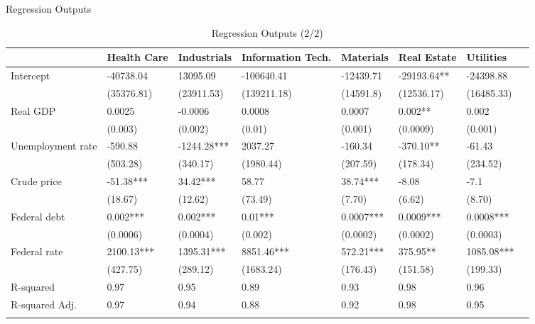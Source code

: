 \documentclass[11pt]{beamer}
\begin{document}
\begin{frame}{Regression Outputs}

\begin{table}
\caption{Regression Outputs (2/2)}
\label{}
\begin{center}
\tiny
\begin{tabular}{llllllll}  \hline                    &  Health Care & Industrials & Information Tech. & Materials & Real Estate & Utilities  \\  \hline 
Intercept             & -40738.04      & 13095.09        & -100640.41          & -12439.71     & -29193.64**    & -24398.88      \\                      & (35376.81)     & (23911.53)      & (139211.18)         & (14591.8)    & (12536.17)     & (16485.33)     \\  
Real GDP            & 0.0025           & -0.0006           & 0.0008                & 0.0007          & 0.002**         & 0.002           \\                     & (0.003)         & (0.002)          & (0.01)              & (0.001)        & (0.0009)         & (0.001)         \\  
Unemployment rate     & -590.88        & -1244.28***     & 2037.27             & -160.34       & -370.10**      & -61.43         \\                        & (503.28)       & (340.17)        & (1980.44)           & (207.59)      & (178.34)       & (234.52)       \\  
Crude price              & -51.38***      & 34.42***        & 58.77             & 38.74***      & -8.08          & -7.1          \\                       & (18.67)        & (12.62)         & (73.49)             & (7.70)        & (6.62)         & (8.70)         \\  
Federal debt            & 0.002***        & 0.002***         & 0.01***             & 0.0007***       & 0.0009***        & 0.0008***        \\                        & (0.0006)         & (0.0004)          & (0.002)              & (0.0002)        & (0.0002)         & (0.0003)         \\  
Federal rate        & 2100.13***     & 1395.31***      & 8851.46***          & 572.21***     & 375.95**       & 1085.08***     \\                  & (427.75)       & (289.12)        & (1683.24)           & (176.43)      & (151.58)       & (199.33)       \\ \hline  
R-squared           & 0.97           & 0.95            & 0.89                & 0.93          & 0.98           & 0.96           \\   
R-squared Adj.              & 0.97           & 0.94            & 0.88                & 0.92          & 0.98           & 0.95          \\  \hline  \\
\end{tabular}
\end{center}
\end{table}
\end{frame}
\end{document}
